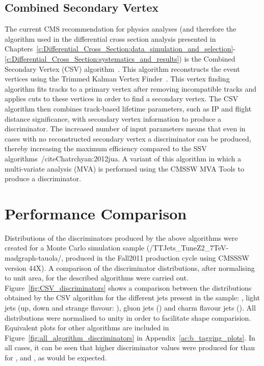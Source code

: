 \subsection*{Combined Secondary Vertex}
\label{ss:combined_secondary_vertex}
The current CMS recommendation for physics analyses (and therefore the algorithm used in the differential
cross section analysis presented in
Chapters~\ref{c:Differential_Cross_Section:data_simulation_and_selection}-\ref{c:Differential_Cross_Section:systematics_and_results})
is the Combined Secondary Vertex (CSV) algorithm~\cite{Weiser:2006md}. This algorithm reconstructs the event
vertices using the Trimmed Kalman Vertex Finder~\cite{Speer:927395}. This vertex finding algorithm fits tracks
to a primary vertex after removing incompatible tracks and applies cuts to these vertices in order to find a
secondary vertex. The CSV algorithm then combines track-based lifetime parameters, such as IP and flight
distance significance, with secondary vertex information to produce a discriminator. The increased number of
input parameters means that even in cases with no reconstructed secondary vertex a discriminator can be
produced, thereby increasing the maximum efficiency compared to the SSV algorithms~/cite{Chatrchyan:2012jua}.
A variant of this algorithm in which a multi-variate analysis (MVA) is performed using the CMSSW MVA Tools to
produce a discriminator.

\section{Performance Comparison}
\label{s:performance_comparison}

Distributions of the discriminators produced by the above algorithms were created for a \ttbar \MADGRAPH Monte
Carlo simulation sample (/TTJets\_TuneZ2\_7TeV-madgraph-tauola/, produced in the Fall2011 production cycle
using CMSSSW version 44X). A comparison of the discriminator distributions, after normalising to unit area,
for the described algorithms were carried out. Figure~\ref{fig:CSV_discriminators} shows a comparison between
the distributions obtained by the CSV algorithm for the different jets present in the sample: \bjets, light
jets (up, down and strange flavour: \udsjets), gluon jets (\gjets) and charm flavour jets (\cjets). All
distributions were normalised to unity in order to facilitate shape comparision. Equivalent plots for other
algorithms are included in Figure~\ref{fig:all_algorithm_discriminators} in Appendix~\ref{ac:b_tagging_plots}.
In all cases, it can be seen that higher discriminator values were produced for \bjets than for \udsjets,
\gjets and \cjets, as would be expected.


